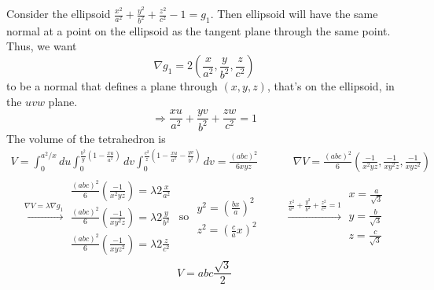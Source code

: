 \documentclass[twoside]{amsart}
\theoremstyle{plain}
\theoremstyle{definition}
\newcommand{\exercisehead}[1]
  {
   \noindent{\small\bf Exercise #1.}
   \smallskip}
\begin{document}
\exercisehead{10} Consider the ellipsoid $\frac{x^2}{a^2} + \frac{y^2}{b^2} + \frac{z^2}{c^2} - 1 = g_1$.  Then ellipsoid will have the same normal at a point on the ellipsoid as the tangent plane through the same point.  Thus, we want
\[
\nabla g_1 = 2 \left( \frac{x}{a^2}, \frac{y}{b^2}, \frac{z}{c^2} \right)
\]
to be a normal that defines a plane through $(x,y,z)$, that's on the ellipsoid, in the $uvw$ plane.
\[
\Longrightarrow \frac{xu}{a^2} + \frac{yv}{b^2} + \frac{zw}{c^2} = 1 
\]
The volume of the tetrahedron is
\[
\begin{aligned}
  V  = \int_0^{a^2/x} du \int_0^{ \frac{b^2}{y} \left( 1 - \frac{xu}{a^2} \right) } dv \int_0^{ \frac{c^2}{z} \left( 1 - \frac{xu}{a^2} - \frac{yv}{b^2} \right) } dv = \frac{(abc)^2}{6 xyz} \quad \quad \quad \,    \nabla V = \frac{(abc)^2}{6} \left( \frac{-1}{ x^2 y z}, \frac{-1}{ xy^2 z}, \frac{-1}{xyz^2} \right) 
\end{aligned}
\]
\[
\begin{gathered}
  \xrightarrow{  \nabla V = \lambda \nabla g_1 } \begin{aligned} \frac{ (abc)^2 }{6} \left( \frac{-1}{ x^2 y z} \right) = \lambda 2 \frac{x}{a^2} \\  \frac{ (abc)^2 }{6} \left( \frac{-1}{ x y^2 z} \right) = \lambda 2 \frac{y}{b^2} \\   \frac{ (abc)^2 }{6} \left( \frac{-1}{ x y z^2} \right) = \lambda 2 \frac{z}{c^2} \end{aligned} \text{ so } \begin{aligned} y^2 = \left( \frac{bx}{a} \right)^2 \\ z^2 = \left( \frac{c}{a} x \right)^2 \end{aligned} \quad \quad \, 
  \xrightarrow{ \frac{x^2}{a^2} + \frac{y^2}{b^2} + \frac{z^2}{c^2} = 1 } \begin{aligned} x = \frac{a}{\sqrt{3}} \\ y = \frac{b}{\sqrt{3}} \\ z = \frac{c}{ \sqrt{3}} \end{aligned} 
\end{gathered}
\]
\[
\boxed{ V = abc \frac{\sqrt{3}}{2} }
\]
\end{document}
